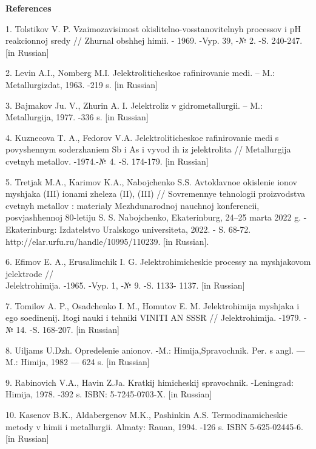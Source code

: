 \begin{center}
{\bfseries References}
\end{center}

\begin{noparindent}
1. Tolstikov V. P. Vzaimozavisimost\textquotesingle{}
okislitel\textquotesingle no-vosstanovitel\textquotesingle nyh processov
i pH reakcionnoj sredy // Zhurnal obshhej himii. - 1969. -Vyp. 39, -№ 2.
-S. 240-247. {[}in Russian{]}

2. Levin A.I., Nomberg M.I. Jelektroliticheskoe rafinirovanie medi. --
M.: Metallurgizdat, 1963. -219 s. {[}in Russian{]}

3. Bajmakov Ju. V., Zhurin A. I. Jelektroliz v gidrometallurgii. -- M.:
Metallurgija, 1977. -336 s. {[}in Russian{]}

4. Kuznecova T. A., Fedorov V.A. Jelektroliticheskoe rafinirovanie medi
s povyshennym soderzhaniem Sb i As i vyvod ih iz jelektrolita //
Metallurgija cvetnyh metallov. -1974.-№ 4. -S. 174-179. {[}in Russian{]}

5. Tret\textquotesingle jak M.A., Karimov K.A., Nabojchenko S.S.
Avtoklavnoe okislenie ionov mysh\textquotesingle jaka (III) ionami
zheleza (II), (III) // Sovremennye tehnologii proizvodstva cvetnyh
metallov : materialy Mezhdunarodnoj nauchnoj konferencii, posvjashhennoj
80-letiju S. S. Nabojchenko, Ekaterinburg, 24--25 marta 2022 g. -
Ekaterinburg: Izdatel\textquotesingle stvo Ural\textquotesingle skogo
universiteta, 2022. - S. 68-72. http://elar.urfu.ru/handle/10995/110239.
{[}in Russian{]}.

6. Efimov E. A., Erusalimchik I. G. Jelektrohimicheskie processy na
mysh\textquotesingle jakovom jelektrode // \\Jelektrohimija. -1965. -Vyp.
1, -№ 9. -S. 1133- 1137. {[}in Russian{]}

7. Tomilov A. P., Osadchenko I. M., Homutov E. M. Jelektrohimija
mysh\textquotesingle jaka i ego soedinenij. Itogi nauki i tehniki VINITI
AN SSSR // Jelektrohimija. -1979. -№ 14. -S. 168-207. {[}in Russian{]}

8. Uil\textquotesingle jams U.Dzh. Opredelenie anionov. -M.:
Himija,Spravochnik. Per. s angl. --- M.: Himija, 1982 --- 624 s. {[}in
Russian{]}

9. Rabinovich V.A., Havin Z.Ja. Kratkij himicheskij spravochnik.
-Leningrad: Himija, 1978. -392 s. ISBN: 5-7245-0703-X. {[}in Russian{]}

10. Kasenov B.K., Aldabergenov M.K., Pashinkin A.S. Termodinamicheskie
metody v himii i metallurgii. Almaty: Rauan, 1994. -126 s. ISBN
5-625-02445-6. {[}in Russian{]}


\end{noparindent}
